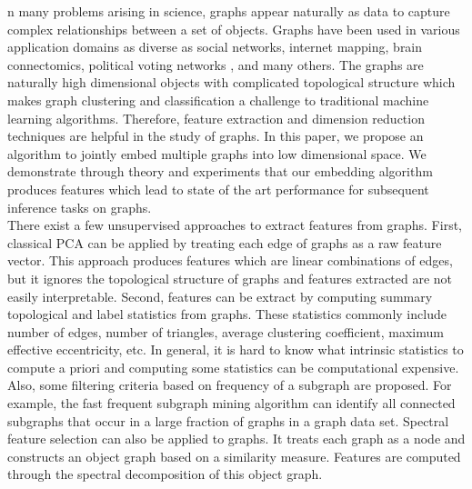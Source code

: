 \documentclass[10pt,journal,compsoc]{IEEEtran}
\begin{document}
\noindent {}n many problems arising in science, graphs appear naturally as data to capture complex relationships between a set of objects. Graphs have been used in various application domains as diverse as social networks\cite{otte2002social}, internet mapping\cite{govindan2000heuristics}, brain connectomics\cite{bullmore2011brain}, political voting networks \cite{ward2011network},  and many others. The graphs are naturally high dimensional objects with complicated topological structure which makes graph clustering and classification a challenge to traditional machine learning algorithms. Therefore, feature extraction and dimension reduction techniques are helpful in the study of graphs. In this paper, we propose an algorithm to jointly embed multiple graphs into low dimensional space. We demonstrate through theory and experiments that our embedding algorithm produces features which lead to state of the art performance for subsequent inference tasks on graphs.  \\

\noindent There exist a few unsupervised approaches to extract features from graphs. First, classical PCA can be applied by treating each edge of graphs as a raw feature vector\cite{jolliffe2002principal}. This approach produces features which are linear combinations of edges, but it ignores the topological structure of graphs and features extracted are not easily interpretable. Second, features can be extract by computing summary topological and label statistics from graphs\cite{li2011graph}. These statistics commonly include number of edges, number of triangles, average clustering coefficient, maximum effective eccentricity, etc. In general, it is hard to know what intrinsic statistics to compute a priori and computing some statistics can be computational expensive. Also, some filtering criteria based on frequency of a subgraph are proposed. For example, the fast frequent subgraph mining algorithm can identify all connected subgraphs that occur in a large fraction of graphs in a graph data set\cite{huan2003efficient}. Spectral feature selection can also be applied to graphs. It treats each graph as a node and constructs an object graph based on a similarity measure. Features are computed through the spectral decomposition of this object graph\cite{zhao2007spectral}. \\
\end{document}
